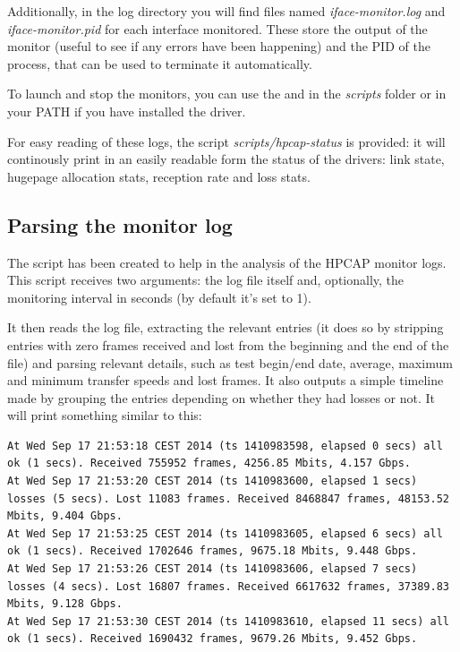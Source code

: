 \documentclass[a4paper,oneside]{hpman}
\begin{document}
Additionally, in the log directory you will find files named \textit{iface-monitor.log} and \textit{iface-monitor.pid} for each interface monitored. These store the output of the monitor (useful to see if any errors have been happening) and the PID of the process, that can be used to terminate it automatically.

To launch and stop the monitors, you can use the  and  in the \textit{scripts} folder or in your PATH if you have installed the driver.

For easy reading of these logs, the script \textit{scripts/hpcap-status} is provided: it will continously print in an easily readable form the status of the drivers: link state, hugepage allocation stats, reception rate and loss stats.

\subsection{Parsing the monitor log}

The script  has been created to help in the analysis of the HPCAP monitor logs. This script receives two arguments: the log file itself and, optionally, the monitoring interval in seconds (by default it's set to 1).

It then reads the log file, extracting the relevant entries (it does so by stripping entries with zero frames received and lost from the beginning and the end of the file) and parsing relevant details, such as test begin/end date, average, maximum and minimum transfer speeds and lost frames. It also outputs a simple timeline made by grouping the entries depending on whether they had losses or not. It will print something similar to this:

\begin{lstlisting}
At Wed Sep 17 21:53:18 CEST 2014 (ts 1410983598, elapsed 0 secs) all ok (1 secs). Received 755952 frames, 4256.85 Mbits, 4.157 Gbps.
At Wed Sep 17 21:53:20 CEST 2014 (ts 1410983600, elapsed 1 secs) losses (5 secs). Lost 11083 frames. Received 8468847 frames, 48153.52 Mbits, 9.404 Gbps.
At Wed Sep 17 21:53:25 CEST 2014 (ts 1410983605, elapsed 6 secs) all ok (1 secs). Received 1702646 frames, 9675.18 Mbits, 9.448 Gbps.
At Wed Sep 17 21:53:26 CEST 2014 (ts 1410983606, elapsed 7 secs) losses (4 secs). Lost 16807 frames. Received 6617632 frames, 37389.83 Mbits, 9.128 Gbps.
At Wed Sep 17 21:53:30 CEST 2014 (ts 1410983610, elapsed 11 secs) all ok (1 secs). Received 1690432 frames, 9679.26 Mbits, 9.452 Gbps.
\end{lstlisting}
\end{document}

